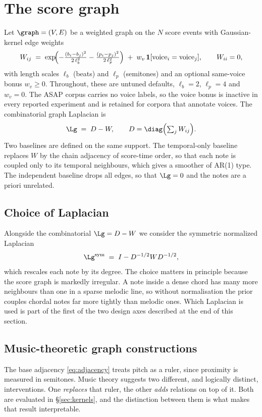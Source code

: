 \section{The score graph}\label{sec:scoregraph}
Let $\graph = (V, E)$ be a weighted graph on the $N$ score events with
Gaussian-kernel edge weights
\begin{equation}
  W_{ij} \;=\; \exp\!\Bigl( -\tfrac{(b_i - b_j)^2}{2\,\ell_b^2} - \tfrac{(p_i - p_j)^2}{2\,\ell_p^2} \Bigr)
  \;+\; w_v\, \mathbf{1}[\text{voice}_i = \text{voice}_j],
  \qquad W_{ii} = 0,
  \label{eq:adjacency}
\end{equation}
with length scales $\ell_b$ (beats) and $\ell_p$ (semitones) and an optional
same-voice bonus $w_v \ge 0$. Throughout, these are untuned defaults,
$\ell_b = 2$, $\ell_p = 4$ and $w_v = 0$. The ASAP corpus carries no voice
labels, so the voice bonus is inactive in every reported experiment and is
retained for corpora that annotate voices. The combinatorial graph Laplacian
is
\begin{equation}
  \Lg \;=\; D - W, \qquad D = \diag\Bigl(\textstyle\sum_j W_{ij}\Bigr).
  \label{eq:laplacian}
\end{equation}
Two baselines are defined on the same support. The temporal-only baseline
replaces $W$ by the chain adjacency of score-time order, so that each note is
coupled only to its temporal neighbours, which gives a smoother of AR(1)
type. The independent baseline drops all edges, so that
$\Lg = 0$ and the notes are a priori unrelated.

\subsection{Choice of Laplacian}
Alongside the combinatorial $\Lg = D - W$ we consider the symmetric
normalized Laplacian
\begin{equation}
  \Lg^{\mathrm{sym}} \;=\; I - D^{-1/2} W D^{-1/2},
  \label{eq:lapsym}
\end{equation}
which rescales each note by its degree. The choice matters in principle
because the score graph is markedly irregular. A note inside a dense chord
has many more neighbours than one in a sparse melodic line, so without
normalisation the prior couples chordal notes far more tightly than melodic
ones. Which Laplacian is used is part of the first of the two design axes
described at the end of this section.

\subsection{Music-theoretic graph constructions}\label{sec:graphvariants}
The base adjacency \eqref{eq:adjacency} treats pitch as a ruler, since
proximity is measured in semitones. Music theory suggests two different, and
logically distinct, interventions. One \emph{replaces} that ruler, the other
\emph{adds} relations on top of it. Both are evaluated in
\S\ref{sec:kernels}, and the distinction between them is what makes that
result interpretable.


